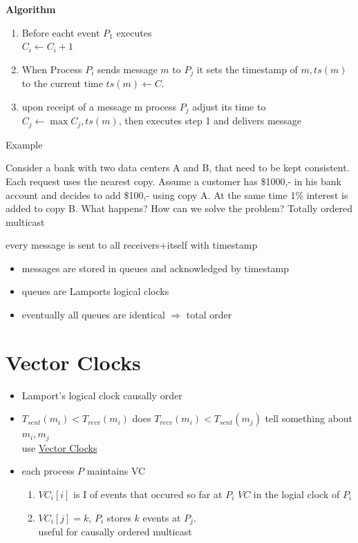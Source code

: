 \documentclass[ngerman,a4paper]{report}
\begin{document}
\textbf{Algorithm}
\begin{enumerate}
\item Before eacht event $P_1$ executes\\
$C_i \leftarrow C_i + 1$
\item When Process $P_i$ sends message $m$ to $P_j$ it sets the timestamp of $m, ts(m)$ to the current time $ts(m) \leftarrow C$.
\item upon receipt of a message m process $P_j$ adjust its time to $C_j \leftarrow \max{C_j, ts(m)}$, then executes step 1 and delivers message
\end{enumerate}
Example

Consider a bank with two data centers A and B, that need to be kept consistent. Each request uses the nearest copy.
Assume a customer has \$1000,- in his bank account and decides to add \$100,- using copy A. At the same time 1\% interest is added to copy B. What happens? How can we solve the problem?
Totally ordered multicast

every message is sent to all receivers+itself with timestamp\\
\begin{itemize}
	\item messages are stored in queues  and acknowledged by timestamp
	\item queues are Lamports logical clocks
	\item eventually all queues are identical $\Rightarrow$ total order
\end{itemize}

\section{Vector Clocks}
\begin{itemize}
	\item Lamport's logical clock causally order
	\item $T_{sent}(m_i) < T_{recv} (m_i)$
		does $T_{recv} (m_i) < T_{sent} (m_j)$
		tell something about $m_i,m_j$\\
		use \underline{Vector Clocks}
	\item each process $P$ maintains VC
		\begin{enumerate}
			\item $VC_i[i]$ is I of events that occured so far at $P_i$
				$VC$ in the logial clock of $P_i$
			\item $VC_i[j]=k$, $P_i$ stores $k$ events at $P_j$.\\
				useful for causally ordered multicast\\
		\end{enumerate}
\end{itemize}
\end{document}
